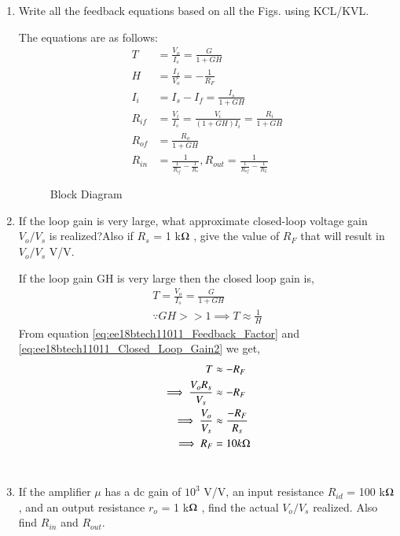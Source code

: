 \begin{enumerate}[label=\thesection.\arabic*.,ref=\thesection.\theenumi]
\item Write all the feedback equations based on all the Figs. using KCL/KVL.

\solution The equations are as follows:
%
\begin{align}
\label{eq:ee18btech11011_Closed_loop_Gain1}
T &= \frac{V_{o}}{I_{s}} = \frac{G}{1+GH}
\\
\label{eq:ee18btech11011_Feedback_Factor}
H &= \frac{I_{f}}{V_{o}} = -\frac{1}{R_F}
\\
\label{eq:ee18btech11011_I_i}
I_{i} &= I_{s} - I_{f} = \frac{I_{s}}{1+GH}
\\
\label{eq:ee18btech11011_R_if}
R_{i f} &= \frac{V_{i}}{I_{s}} = \frac{V_{i}}{(1+GH)I_{i}} =\frac{R_{i}}{1+GH}
\\
\label{eq:ee18btech11011_R_of}
R_{o f} &= \frac{R_{o}}{1+GH}
\\
\label{eq:ee18btech11011_R_in_and_R_out}
R_{i n} &= \frac{1}{\frac{1}{R_{i f}} - \frac{1}{R_{s}}} , R_{o u t} = \frac{1}{\frac{1}{R_{o f}} - \frac{1}{R_{L}}}
\end{align}
%

\begin{table}[!ht]
\centering

\caption{}
\label{table: Parameters_Table}
\end{table}

\begin{figure}[!ht]
	\begin{center}
			\resizebox{\columnwidth}{!}{}
	\end{center}
\caption{Block Diagram}
\label{fig:Block Diagram}
\end{figure}

\item If the loop gain is very large, what approximate closed-loop voltage gain $V_{o}/V_{s}$ is realized?Also if $R_{s}$ = 1 k$\ohm$ , give the value of $R_{F}$ that will result in $V_{o}/V_{s}$  V/V.

\solution If the loop gain GH is very large then the closed loop gain is,
%
\begin{align}
T = \frac{V_{o}}{I_{s}} = \frac{G}{1+GH}
\\
\because GH >> 1 \implies T \approx \frac{1}{H}
\label{eq:ee18btech11011_Closed_Loop_Gain2}
\end{align}
%
From equation \ref{eq:ee18btech11011_Feedback_Factor} and \ref{eq:ee18btech11011_Closed_Loop_Gain2} we get,
%
\begin{align}
T &\approx -R_{F}
\\
\implies \frac{V_{o}R_s}{V_{s}} &\approx -R_{F}
\\
\implies \frac{V_{o}}{V_{s}} &\approx \frac{-R_{F}}{R_{s}}
\\
\implies R_F &= 10k\ohm
\end{align}
%
\\
\item If the amplifier $\mu$ has a dc gain of $10^3$ V/V, an input resistance $R_{i d}$ = 100 k$\ohm$ , and an output resistance $r_{o}$ = 1 k$\ohm$ , find the actual $V_{o}/V_{s}$ realized. Also find $R_{i n}$ and $R_{o u t}$.


\end{enumerate}
